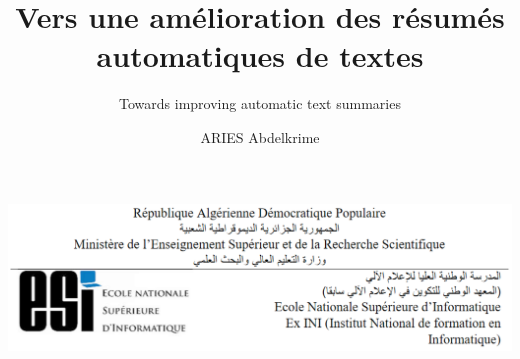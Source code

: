 \title{Vers une amélioration des résumés automatiques de textes}
\subtitle{Towards improving automatic text summaries}
\author{ARIES Abdelkrime}

%

%

\pagestyle{empty}

\noindent
\includegraphics[width=\textwidth]{figures/logo/esi-header.png}


\makeatletter %

